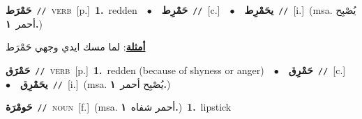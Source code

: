 \documentclass[10pt,a4paper,twoside]{article} %
\begin{document}
\begin{multicols}{2}
{\setlength\topsep{0pt}\textbf{\foreignlanguage{arabic}{حَمْرَط}}\ {\color{gray}\texttt{//}\color{black}}\ \textsc{verb}\ [p.]\ \textbf{1.}~redden\ \ $\bullet$\ \ \setlength\topsep{0pt}\textbf{\foreignlanguage{arabic}{حَمْرِط}}\ {\color{gray}\texttt{//}\color{black}}\ [c.]\ \ $\bullet$\ \ \setlength\topsep{0pt}\textbf{\foreignlanguage{arabic}{يحَمْرِط}}\ {\color{gray}\texttt{//}\color{black}}\ [i.]\ \color{gray}(msa. \foreignlanguage{arabic}{يُصْبِح أحمر}~\foreignlanguage{arabic}{\textbf{١.}})\color{black}\  \begin{flushright}\color{gray}\foreignlanguage{arabic}{\textbf{\underline{\foreignlanguage{arabic}{أمثلة}}}: لما مسك ايدي وجهي حَمْرَط}\end{flushright}\color{black}} \vspace{2mm}

{\setlength\topsep{0pt}\textbf{\foreignlanguage{arabic}{حَمْرَق}}\ {\color{gray}\texttt{//}\color{black}}\ \textsc{verb}\ [p.]\ \textbf{1.}~redden (because of shyness or anger)\ \ $\bullet$\ \ \setlength\topsep{0pt}\textbf{\foreignlanguage{arabic}{حَمْرِق}}\ {\color{gray}\texttt{//}\color{black}}\ [c.]\ \ $\bullet$\ \ \setlength\topsep{0pt}\textbf{\foreignlanguage{arabic}{يحَمْرِق}}\ {\color{gray}\texttt{//}\color{black}}\ [i.]\ \color{gray}(msa. \foreignlanguage{arabic}{يُصْبِح أحمر}~\foreignlanguage{arabic}{\textbf{١.}})\color{black}\ } \vspace{2mm}

{\setlength\topsep{0pt}\textbf{\foreignlanguage{arabic}{حَومْرَة}}\ {\color{gray}\texttt{//}\color{black}}\ \textsc{noun}\ [f.]\ \color{gray}(msa. \foreignlanguage{arabic}{أحمر شفاه}~\foreignlanguage{arabic}{\textbf{١.}})\color{black}\ \textbf{1.}~lipstick\ } \vspace{2mm}


\end{multicols}
\end{document}
